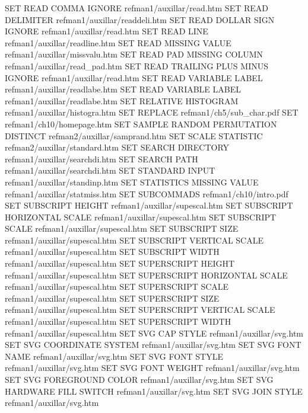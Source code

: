 SET READ COMMA IGNORE                   refman1/auxillar/read.htm
SET READ DELIMITER                      refman1/auxillar/readdeli.htm
SET READ DOLLAR SIGN IGNORE             refman1/auxillar/read.htm
SET READ LINE                           refman1/auxillar/readline.htm
SET READ MISSING VALUE                  refman1/auxillar/missvalu.htm
SET READ PAD MISSING COLUMN             refman1/auxillar/read_pad.htm
SET READ TRAILING PLUS MINUS IGNORE     refman1/auxillar/read.htm
SET READ VARIABLE LABEL                 refman1/auxillar/readlabe.htm
SET READ VARIABLE LABEL                 refman1/auxillar/readlabe.htm
SET RELATIVE HISTOGRAM                  refman1/auxillar/histogra.htm
SET REPLACE                             refman1/ch5/sub_char.pdf
SET                                     refman1/ch10/homepage.htm
SET SAMPLE RANDOM PERMUTATION DISTINCT  refman2/auxillar/samprand.htm
SET SCALE STATISTIC                     refman2/auxillar/standard.htm
SET SEARCH DIRECTORY                    refman1/auxillar/searchdi.htm
SET SEARCH PATH                         refman1/auxillar/searchdi.htm
SET STANDARD INPUT                      refman1/auxillar/standinp.htm
SET STATISTICS MISSING VALUE            refman1/auxillar/statmiss.htm
SET SUBCOMMADS                          refman1/ch10/intro.pdf
SET SUBSCRIPT HEIGHT                    refman1/auxillar/supescal.htm
SET SUBSCRIPT HORIZONTAL SCALE          refman1/auxillar/supescal.htm
SET SUBSCRIPT SCALE                     refman1/auxillar/supescal.htm
SET SUBSCRIPT SIZE                      refman1/auxillar/supescal.htm
SET SUBSCRIPT VERTICAL SCALE            refman1/auxillar/supescal.htm
SET SUBSCRIPT WIDTH                     refman1/auxillar/supescal.htm
SET SUPERSCRIPT HEIGHT                  refman1/auxillar/supescal.htm
SET SUPERSCRIPT HORIZONTAL SCALE        refman1/auxillar/supescal.htm
SET SUPERSCRIPT SCALE                   refman1/auxillar/supescal.htm
SET SUPERSCRIPT SIZE                    refman1/auxillar/supescal.htm
SET SUPERSCRIPT VERTICAL SCALE          refman1/auxillar/supescal.htm
SET SUPERSCRIPT WIDTH                   refman1/auxillar/supescal.htm
SET SVG CAP STYLE                       refman1/auxillar/svg.htm
SET SVG COORDINATE SYSTEM               refman1/auxillar/svg.htm
SET SVG FONT NAME                       refman1/auxillar/svg.htm
SET SVG FONT STYLE                      refman1/auxillar/svg.htm
SET SVG FONT WEIGHT                     refman1/auxillar/svg.htm
SET SVG FOREGROUND COLOR                refman1/auxillar/svg.htm
SET SVG HARDWARE FILL SWITCH            refman1/auxillar/svg.htm
SET SVG JOIN STYLE                      refman1/auxillar/svg.htm
